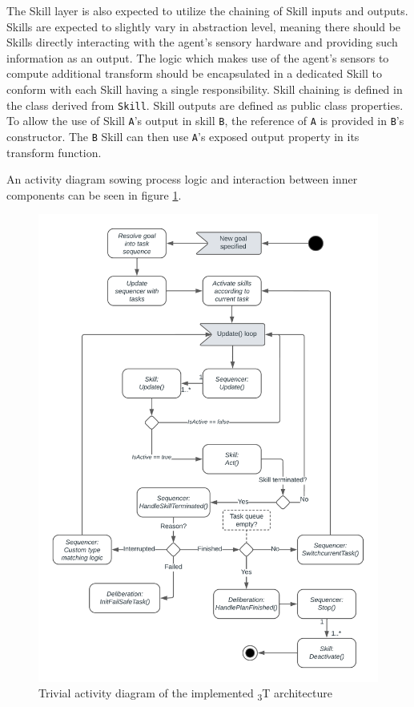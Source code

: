 \documentclass[0main.tex]{subfiles}
\begin{document}
The Skill layer is also expected to utilize the chaining of Skill inputs and outputs. Skills are 
expected to slightly vary in abstraction level, meaning there should be Skills directly 
interacting with the agent's sensory hardware and providing such information as an output. 
The logic which makes use of the agent's sensors to compute additional transform should be encapsulated in
a dedicated Skill to conform with each Skill having a single responsibility. Skill chaining 
is defined in the class derived from \texttt{Skill}. Skill outputs are defined as 
public class properties. To allow the use of Skill \texttt{A}'s output in skill \texttt{B},
the reference of \texttt{A} is provided in \texttt{B}'s constructor. The \texttt{B} Skill 
can then use \texttt{A}'s exposed output property in its transform function.

An activity diagram sowing process logic and interaction between inner components can be 
seen in figure \ref{fig-activity-diagram}.

\begin{figure}[htbp]
    \centering
    \includegraphics[width=.9\textwidth]{3T-Activity-diagram.png}
    \caption{Trivial activity diagram of the implemented \textsubscript{3}T architecture}
    \label{fig-activity-diagram}
\end{figure}
\end{document}
